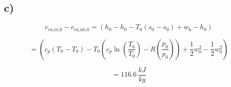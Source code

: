

\subsection*{c)}

\[
e_{\text{ex,er,0}} - e_{\text{ex,ist,0}} = (h_0 - h_0 - T_0 (s_0 - s_0) + w_6 - h_0)
\]

\[
= \left( c_p (T_0 - T_0) - T_0 \left( c_p \ln \left( \frac{T_0}{T_0} \right) - R \left( \frac{p_0}{p_0} \right) \right) + \frac{1}{2} w_0^2 - \frac{1}{2} w_0^2 \right)
\]

\[
= 116.6 \, \frac{kJ}{kg}
\]